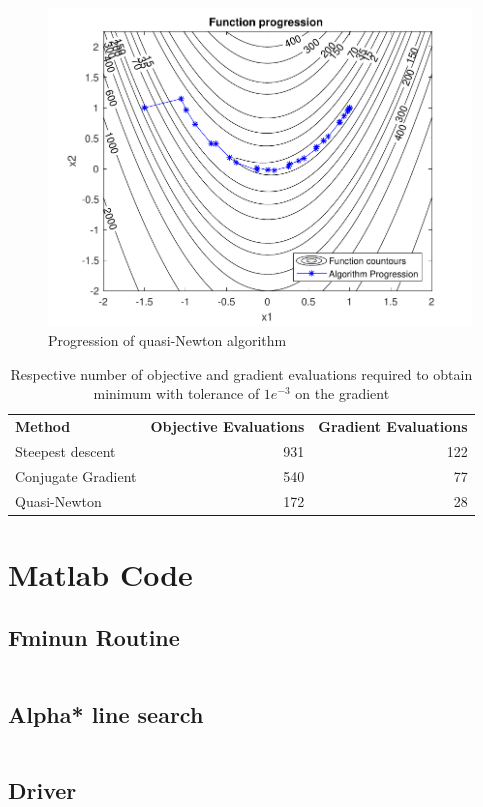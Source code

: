 \documentclass{article}
\newcommand{\wide}{0.7\linewidth}
\begin{document}
\begin{figure}[H]
	\centering
	\includegraphics[width=\wide]{progression3.pdf}
	\caption{Progression of quasi-Newton algorithm}
	\label{fig:steepest3}
\end{figure}

\begin{table}[H]
	\centering
	\caption{Respective number of objective and gradient evaluations required to obtain minimum with tolerance of $1e^{-3}$ on the gradient}
	\label{my-label}
	\begin{tabular}{|l|r|r|}
		\hline
		\textbf{Method}    & \textbf{Objective Evaluations} & \textbf{Gradient Evaluations} \\
		Steepest descent   &                            931 &                           122 \\
		Conjugate Gradient &                            540 &                            77 \\
		Quasi-Newton       &                            172 &                            28 \\ \hline
	\end{tabular}
\end{table}


\section{Matlab Code}

\subsection{Fminun Routine}
\inputminted[xleftmargin=10pt,linenos]{matlab}{fminun.m}
\subsection{Alpha* line search}
\inputminted[xleftmargin=10pt, linenos]{matlab}{aPrime.m}
\subsection{Driver}
\inputminted[xleftmargin=10pt,linenos]{matlab}{fminunDriv.m}


\end{document}
